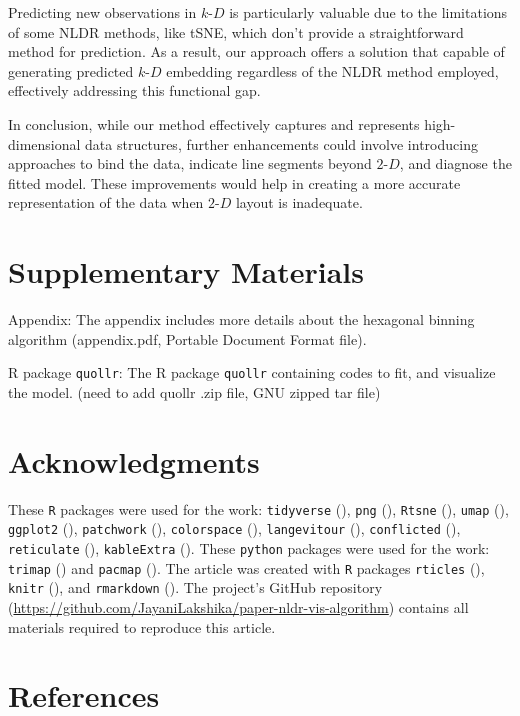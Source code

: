 \documentclass[
  12pt]{article}
\newcommand\kD{$k\text{-}D$}
\newcommand\gD{$2\text{-}D$}
\begin{document}
Predicting new observations in \kD{} is particularly valuable due to the
limitations of some NLDR methods, like tSNE, which don't provide a
straightforward method for prediction. As a result, our approach offers
a solution that capable of generating predicted \kD{} embedding
regardless of the NLDR method employed, effectively addressing this
functional gap.

In conclusion, while our method effectively captures and represents
high-dimensional data structures, further enhancements could involve
introducing approaches to bind the data, indicate line segments beyond
\gD{}, and diagnose the fitted model. These improvements would help in
creating a more accurate representation of the data when \gD{} layout is
inadequate.

\section{Supplementary Materials}\label{supplementary-materials}

Appendix: The appendix includes more details about the hexagonal binning
algorithm (appendix.pdf, Portable Document Format file).

R package \texttt{quollr}: The R package \texttt{quollr} containing
codes to fit, and visualize the model. (need to add quollr .zip file,
GNU zipped tar file)

\section{Acknowledgments}\label{acknowledgments}

These \texttt{R} packages were used for the work: \texttt{tidyverse}
(\citet{hadley2019}), \texttt{png} (\citet{simon2022}), \texttt{Rtsne}
(\citet{jesse2015}), \texttt{umap} (\citet{tomasz2023}),
\texttt{ggplot2} (\citet{hadley2016}), \texttt{patchwork}
(\citet{thomas2024}), \texttt{colorspace} (\citet{achim2020}),
\texttt{langevitour} (\citet{harisson2024}), \texttt{conflicted}
(\citet{hadley2023}), \texttt{reticulate} (\citet{kevin2024}),
\texttt{kableExtra} (\citet{hao2024}). These \texttt{python} packages
were used for the work: \texttt{trimap} (\citet{amid2022}) and
\texttt{pacmap} (\citet{yingfan2021}). The article was created with
\texttt{R} packages \texttt{rticles} (\citet{jjallaire2024}),
\texttt{knitr} (\citet{yihui2014}), and \texttt{rmarkdown}
(\citet{yihui2020}). The project's GitHub repository
(\url{https://github.com/JayaniLakshika/paper-nldr-vis-algorithm})
contains all materials required to reproduce this article.

\section*{References}\label{references}

\renewcommand{\bibsection}{}


\newpage{}
\end{document}
